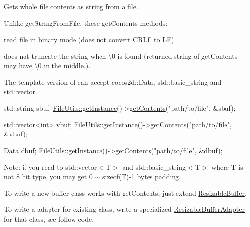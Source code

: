 Gets whole file contents as string from a file.

Unlike get\+String\+From\+File, these get\+Contents methods\+:
\begin{DoxyItemize}
\item read file in binary mode (does not convert C\+R\+LF to LF).
\item does not truncate the string when \textquotesingle{}\textbackslash{}0\textquotesingle{} is found (returned string of get\+Contents may have \textquotesingle{}\textbackslash{}0\textquotesingle{} in the middle.).
\end{DoxyItemize}

The template version of can accept cocos2d\+::\+Data, std\+::basic\+\_\+string and std\+::vector.


\begin{DoxyCode}
std::string sbuf;
\hyperlink{classFileUtils_ac8ced4394d59f5459445ced27ccd0e8a}{FileUtils::getInstance}()->\hyperlink{classFileUtils_a4e9cd9c1ab62bf30f42a423df06016b8}{getContents}(\textcolor{stringliteral}{"path/to/file"}, &sbuf);

std::vector<int> vbuf;
\hyperlink{classFileUtils_ac8ced4394d59f5459445ced27ccd0e8a}{FileUtils::getInstance}()->\hyperlink{classFileUtils_a4e9cd9c1ab62bf30f42a423df06016b8}{getContents}(\textcolor{stringliteral}{"path/to/file"}, &vbuf);

\hyperlink{classData}{Data} dbuf;
\hyperlink{classFileUtils_ac8ced4394d59f5459445ced27ccd0e8a}{FileUtils::getInstance}()->\hyperlink{classFileUtils_a4e9cd9c1ab62bf30f42a423df06016b8}{getContents}(\textcolor{stringliteral}{"path/to/file"}, &dbuf);
\end{DoxyCode}


Note\+: if you read to std\+::vector$<$\+T$>$ and std\+::basic\+\_\+string$<$\+T$>$ where T is not 8 bit type, you may get 0 $\sim$ sizeof(\+T)-\/1 bytes padding.


\begin{DoxyItemize}
\item To write a new buffer class works with get\+Contents, just extend \hyperlink{classResizableBuffer}{Resizable\+Buffer}.
\item To write a adapter for existing class, write a specialized \hyperlink{classResizableBufferAdapter}{Resizable\+Buffer\+Adapter} for that class, see follow code.
\end{DoxyItemize}


